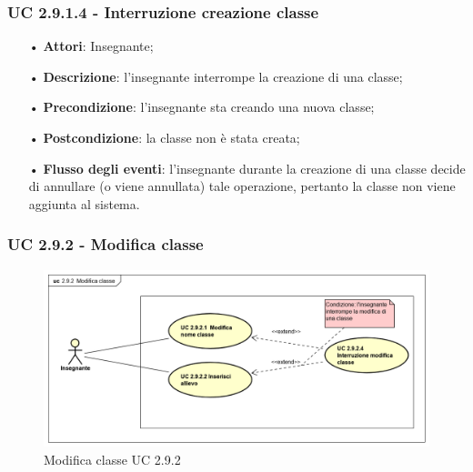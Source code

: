 \subsubsection{UC 2.9.1.4 - Interruzione creazione classe}
\begin{itemize}
	\item[•] \textbf{Attori}: Insegnante;
	\item[•] \textbf{Descrizione}: l'insegnante interrompe la creazione di una classe;
	\item[•] \textbf{Precondizione}: l'insegnante sta creando una nuova classe;
	\item[•] \textbf{Postcondizione}: la classe non è stata creata;
	\item[•] \textbf{Flusso degli eventi}: l'insegnante durante la creazione di una classe decide di annullare (o viene annullata) tale operazione, pertanto la classe non viene aggiunta al sistema.
\end{itemize}



\subsubsection{UC 2.9.2 - Modifica classe}
\begin{figure}[H]
	\centering
	\includegraphics[width=17cm]{img/ModificaClasse.png} 
	\caption{Modifica classe UC 2.9.2}
\end{figure}

